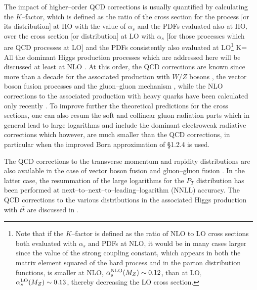 The impact of higher--order QCD corrections is usually quantified by calculating
the $K$--factor, which is defined as the ratio of the cross section for the
process [or its distribution] at HO with the value of $\alpha_s$ and the PDFs
evaluated also at HO, over the cross section [or distribution] at LO with
$\alpha_s$ [for those processes which are QCD processes at LO] and the PDFs
consistently also evaluated at LO\footnote{Note that if the $K$--factor is
defined as the ratio of NLO to LO cross sections both evaluated with $\alpha_s$
and PDFs at NLO, it would be in many cases larger since the value of the strong
coupling constant, which appears in both the matrix element squared of the hard
process and in the parton distribution functions, is smaller at NLO,
$\alpha_s^{\rm NLO}(M_Z) \sim 0.12$, than at LO, $\alpha_s^{\rm LO} (M_Z)\sim
0.13$, thereby decreasing the LO cross section.} 
\beq 
K=  
\eeq 
All the dominant Higgs production processes which are addressed here will be
discussed at least at NLO \cite{Michael-Web}. At this order, the QCD 
corrections are known since
more than a decade for the associated production with $W/Z$ bosons
\cite{HVNLO,HVNLOrest,HVNLO-DS}, the vector boson fusion processes
\cite{pp-Hqq-NLO1,pp-Hqq-NLO2,MC-WWNLO,HVNLO-DS} and the gluon--gluon mechanism
\cite{HggQCD,ggH-Dawson,ggH-GSZ,SDGZ}, while the NLO corrections to the
associated production with heavy quarks have been calculated only recently
\cite{Htt-NLO-DESY,Htt-NLO-US,Htt-NLO-Tev,Hbb-NLO1,Hbb-NLO2}.
To improve further the theoretical predictions
for the cross sections, one can also resum  the soft and collinear gluon
radiation parts which in general lead to large logarithms and include the 
dominant electroweak radiative corrections which however, are much smaller than
the QCD corrections, in particular when the improved Born approximation 
of \S1.2.4 is used.\s 

The QCD corrections to the transverse momentum and rapidity distributions are
also available in the case of vector boson fusion \cite{pp-Hqq-NLO2,MC-WWNLO} 
and gluon--gluon fusion 
\cite{pp-ggH-PT0,pp-ggH-PT1,Pt-eta-distrib,pp-ggH-Ital,pp-ggH-eta1,pp-ggH-eta2,pp-ggH-distrib}.  
In the latter
case, the resummation of the large logarithms for the $P_T$ distribution has
been performed at next--to--next--to--leading--logarithm (NNLL) accuracy. The 
QCD corrections to the various distributions in the associated Higgs production
with $t\bar t$ are discussed in \cite{Htt-NLO-DESY}.\s

